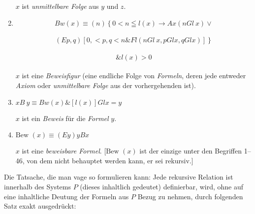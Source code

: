 \documentclass[draft]{scrartcl}
\begin{document}
\begin{enumerate}[1.]
	$x$ ist \textit{unmittelbare Folge} aus $y$ und $z$.

	\item {}$$
		Bw\left(x\right) \equiv \left(n\right)\left\{0 < n \leqq l\left(x\right) \longrightarrow Ax\left(n Gl\ x\right) \lor \right.
	$$\\[\spacebetweenbreakedequations]
	$$	\left.\left(Ep, q\right) \left[0, < p, q < n \& Fl\left(n Gl\ x, p Gl x, q Gl x\right)\right]\right\} 
	$$\\[\spacebetweenbreakedequations]
	$$
		\& l\left(x\right) > 0
	$$\\[\spaceafterbreakedequation]

	$x$ ist eine \textit{Beweisfigur} (eine endliche Folge von \textit{Formeln}, deren jede entweder \textit{Axiom} oder \textit{unmittelbare Folge} aus der vorhergehenden ist).

	\item {}$x B\ y \equiv Bw\left(x\right) \& \left[ l\left(x\right) \right] Gl x = y$%

	$x$ ist ein \textit{Beweis} für die \textit{Formel} $y$.

	\item {}$\text{Bew }\left(x\right) \equiv \left(Ey\right) y B x$

	$x$ ist eine \textit{beweisbare Formel}. [$\text{Bew }\left(x\right)$ ist der einzige unter den Begriffen 1--46, von dem nicht behauptet werden kann, er sei rekursiv.]
\end{enumerate}

Die Tatsache, die man vage so formulieren kann: Jede rekursive Relation
ist innerhalb des Systems $P$ (dieses inhaltlich gedeutet) definierbar, wird,
ohne auf eine inhaltliche Deutung der Formeln
aus $P$ Bezug zu nehmen,
durch folgenden Satz exakt ausgedrückt:
\end{document}
